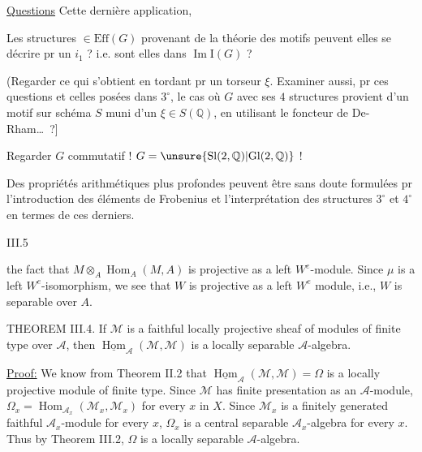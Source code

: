 \uline{Questions} Cette dernière application, 

Les structures $\in\mathrm{Eff}(G)$ provenant de la théorie des motifs peuvent elles  se décrire pr un $i_1$ ? i.e. sont elles dans $\operatorname{Im}\mathrm{I}(G)$ ?


(Regarder ce qui s'obtient en tordant pr un torseur $\xi$. Examiner aussi, pr ces questions et celles posées dans $3^\circ$, le cas où $G$ avec ses $4$ structures provient d'un motif sur schéma  $S$ muni d'un $\xi\in S(\mathbb{Q})$, en utilisant le foncteur de De-Rham\ldots\ ?]

Regarder $G$ commutatif ! $G=\unsure{\mathrm{Sl}(2,\mathbb{Q})|\mathrm{Gl}(2,\mathbb{Q})}$ !

Des propriétés arithmétiques plus profondes peuvent être sans doute formulées pr l'introduction des éléments de Frobenius et l'interprétation des structures $3^\circ$ et $4^\circ$ en termes de ces derniers.




III.5

the fact that $M\otimes_A\operatorname{Hom}_A(M,A)$ is projective as a left $W^e$-module.
Since $\mu$ is a left $W^e$-isomorphism, we see that $W$ is projective as a
left $W^e$ module, i.e., $W$ is separable over $A$.

THEOREM III.4. If $\mathcal M$ is a faithful locally projective sheaf of
modules of finite type over $\mathcal A$, then $\underline{\operatorname{Hom}}_{\mathcal A}(\mathcal M,\mathcal M)$ is a locally separable
$\mathcal A$-algebra.

\uline{Proof:} We know from Theorem II.2 that $\underline{\operatorname{Hom}}_{\mathcal A}(\mathcal M,\mathcal M)=\Omega$
is a locally projective module of finite type. Since $\mathcal M$ has finite
presentation as an $\mathcal A$-module, $\Omega_x=\operatorname{Hom}_{\mathcal A_x}(\mathcal M_x,\mathcal M_x)$ for every $x$ in
$X$. Since $\mathcal M_x$ is a finitely generated faithful $\mathcal A_x$-module for every $x$,
$\Omega_x$ is a central separable $\mathcal A_x$-algebra for every $x$. Thus by
Theorem III.2, $\Omega$ is a locally separable $\mathcal A$-algebra.

